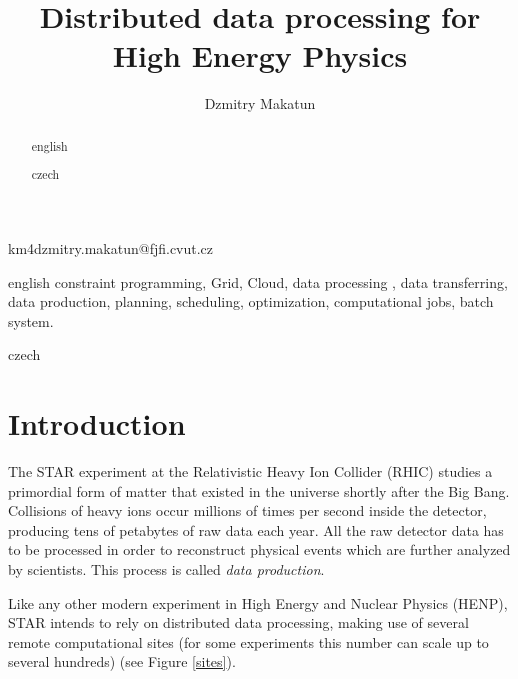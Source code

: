 \documentclass[english]{ddny}
\begin{document}
\title{Distributed data processing for High Energy Physics}
\author{Dzmitry Makatun}{km}{4}{dzmitry.makatun@fjfi.cvut.cz}




\maketitle

\begin{abstract}{english}

\end{abstract}

\begin{keywords}{english}
constraint programming, Grid, Cloud, data processing , data transferring, data production, planning, scheduling, optimization, computational jobs, batch system.
\end{keywords}

\begin{abstract}{czech}

\end{abstract}

\begin{keywords}{czech}

\end{keywords}

\tableofcontents


\section{Introduction}
The STAR experiment at the Relativistic Heavy Ion Collider (RHIC) studies a primordial form of matter that existed in the universe shortly after the Big Bang. Collisions of heavy ions occur millions of times per second inside the detector, producing tens of petabytes of raw data each year. All the raw detector data has to be processed in order to reconstruct physical events which are further analyzed by scientists. This process is called \textit{data production}.

Like any other modern experiment in High Energy and Nuclear Physics (HENP), STAR intends to rely on distributed data processing, making use of several remote computational sites (for some experiments this number can scale up to several hundreds) (see Figure \ref{sites}).
\end{document}
